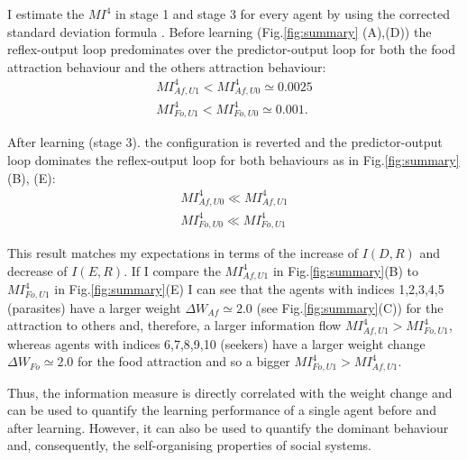 I estimate the $MI^4$ in stage 1 and stage 3 for every agent by using the corrected
 standard deviation formula \citep{Roulston1999:Estimation}. Before learning (Fig.\ref{fig:summary} (A),(D))
the reflex-output loop predominates over the predictor-output loop for both the
food attraction behaviour and the others attraction behaviour:
\begin{eqnarray}
MI^4_{Af,U1}<MI^4_{Af,U0} \simeq 0.0025\\
MI^4_{Fo,U1}<MI^4_{Fo,U0}\simeq 0.001.
\end{eqnarray}

After learning (stage 3). the configuration is reverted and the predictor-output
loop dominates the reflex-output loop for both behaviours as in
Fig.\ref{fig:summary}(B), (E):
\begin{eqnarray}
MI^4_{Af,U0}\ll MI^4_{Af,U1}\\
MI^4_{Fo,U0} \ll MI^4_{Fo,U1}
\end{eqnarray}

This result matches my expectations in terms of the increase of $I(D,R)$ and
decrease of $I(E,R)$.
If I compare the $MI^4_{Af,U1}$ in Fig.\ref{fig:summary}(B) to $MI^4_{Fo,U1}$
in Fig.\ref{fig:summary}(E) I can see that the agents with indices 1,2,3,4,5
(parasites) have a larger weight $\Delta W_{Af}\simeq 2.0$ (see Fig.\ref{fig:summary}(C))
for the attraction to others and, therefore, a larger information flow
$MI^4_{Af,U1}>MI^4_{Fo,U1}$, whereas agents with indices 6,7,8,9,10 (seekers)
 have a larger weight change $\Delta W_{Fo}\simeq 2.0$ for the food attraction
and so a bigger $MI^4_{Fo,U1}>MI^4_{Af,U1}$.

Thus, the information measure is directly correlated with the weight change and
can be used to quantify the learning performance of a single agent before and
after learning. However, it can also be used to quantify the dominant behaviour
and, consequently, the self-organising properties of social systems.


